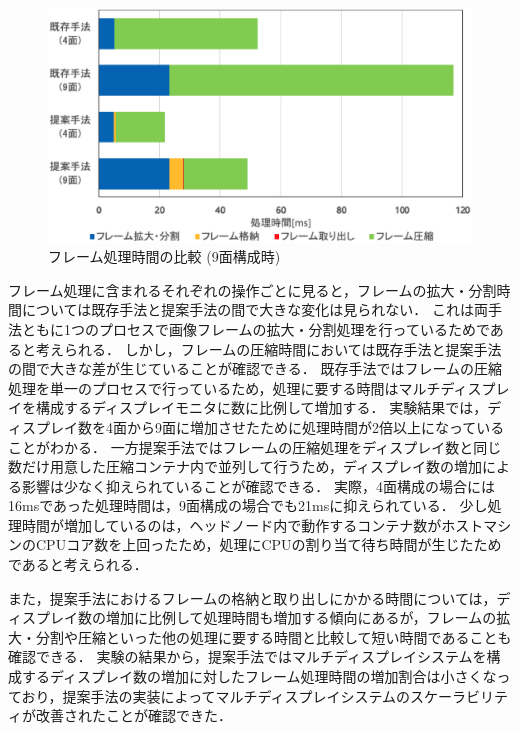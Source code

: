  \begin{figure}[H]
    \hspace*{\fill}
    \includegraphics[width=\linewidth]{./fig/chap4/processing_time_49.eps}
    \hspace*{\fill}
    \caption{フレーム処理時間の比較 (9面構成時)}
    \label{processing_time_9}
\end{figure}

 フレーム処理に含まれるそれぞれの操作ごとに見ると，フレームの拡大・分割時間については既存手法と提案手法の間で大きな変化は見られない．
 これは両手法ともに1つのプロセスで画像フレームの拡大・分割処理を行っているためであると考えられる．
 しかし，フレームの圧縮時間においては既存手法と提案手法の間で大きな差が生じていることが確認できる．
 既存手法ではフレームの圧縮処理を単一のプロセスで行っているため，処理に要する時間はマルチディスプレイを構成するディスプレイモニタに数に比例して増加する．
 実験結果では，ディスプレイ数を4面から9面に増加させたために処理時間が2倍以上になっていることがわかる．
 一方提案手法ではフレームの圧縮処理をディスプレイ数と同じ数だけ用意した圧縮コンテナ内で並列して行うため，ディスプレイ数の増加による影響は少なく抑えられていることが確認できる．
 実際，4面構成の場合には16msであった処理時間は，9面構成の場合でも21msに抑えられている．
 少し処理時間が増加しているのは，ヘッドノード内で動作するコンテナ数がホストマシンのCPUコア数を上回ったため，処理にCPUの割り当て待ち時間が生じたためであると考えられる．

 また，提案手法におけるフレームの格納と取り出しにかかる時間については，ディスプレイ数の増加に比例して処理時間も増加する傾向にあるが，フレームの拡大・分割や圧縮といった他の処理に要する時間と比較して短い時間であることも確認できる．
 実験の結果から，提案手法ではマルチディスプレイシステムを構成するディスプレイ数の増加に対したフレーム処理時間の増加割合は小さくなっており，提案手法の実装によってマルチディスプレイシステムのスケーラビリティが改善されたことが確認できた．


